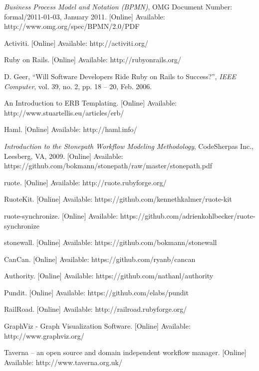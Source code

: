\renewcommand{\bibname}{References}
\begin{thebibliography}{99}

\textit{Business Process Model and Notation
(BPMN)}, OMG Document Number: formal/2011-01-03, January 2011. [Online] Available: http://www.omg.org/spec/BPMN/2.0/PDF

Activiti. [Online] Available: http://activiti.org/

Ruby on Rails. [Online] Available: http://rubyonrails.org/

D. Geer, ``Will Software Developers Ride Ruby on Rails to Success?'', \textit{IEEE Computer}, vol. 39, no. 2, pp. 18 -- 20, Feb. 2006.

An Introduction to ERB Templating. [Online] Available: http://www.stuartellis.eu/articles/erb/

Haml. [Online] Available: http://haml.info/

\textit{Introduction to the Stonepath Workflow Modeling Methodology},
CodeSherpas Inc., Leesberg, VA, 2009. [Online] Available: https://github.com/bokmann/stonepath/raw/master/stonepath.pdf

ruote. [Online] Available: http://ruote.rubyforge.org/

RuoteKit. [Online] Available: https://github.com/kennethkalmer/ruote-kit

ruote-synchronize. [Online] Available: https://github.com/adrienkohlbecker/ruote-synchronize

stonewall. [Online] Available: https://github.com/bokmann/stonewall

CanCan. [Online] Available: https://github.com/ryanb/cancan

Authority. [Online] Available: https://github.com/nathanl/authority

Pundit. [Online] Available: https://github.com/elabs/pundit

RailRoad. [Online] Available: http://railroad.rubyforge.org/

GraphViz - Graph Visualization Software. [Online] Available: http://www.graphviz.org/

Taverna -- an open source and domain independent workflow manager. [Online] Available: http://www.taverna.org.uk/

\end{thebibliography}

%    
%    

